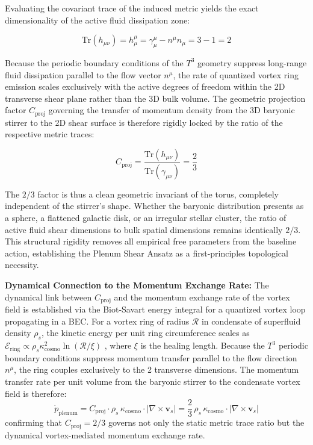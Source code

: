 \documentclass[aps,prd,10pt,twocolumn,superscriptaddress,nofootinbib]{revtex4-2}
\begin{document}
Evaluating the covariant trace of the induced metric yields the exact dimensionality of the active fluid dissipation zone:

\begin{equation}
\text{Tr}(h_{\mu\nu}) = h^\mu_\mu = \gamma^\mu_\mu - n^\mu n_\mu = 3 - 1 = 2
\end{equation}

Because the periodic boundary conditions of the $T^3$ geometry suppress long-range fluid dissipation parallel to the flow vector $n^\mu$, the rate of quantized vortex ring emission scales exclusively with the active degrees of freedom within the 2D transverse shear plane rather than the 3D bulk volume. The geometric projection factor $C_{\text{proj}}$ governing the transfer of momentum density from the 3D baryonic stirrer to the 2D shear surface is therefore rigidly locked by the ratio of the respective metric traces:

\begin{equation}
C_{\text{proj}} = \frac{\text{Tr}(h_{\mu\nu})}{\text{Tr}(\gamma_{\mu\nu})} = \frac{2}{3}
\end{equation}

The $2/3$ factor is thus a clean geometric invariant of the torus, completely independent of the stirrer's shape. Whether the baryonic distribution presents as a sphere, a flattened galactic disk, or an irregular stellar cluster, the ratio of active fluid shear dimensions to bulk spatial dimensions remains identically $2/3$. This structural rigidity removes all empirical free parameters from the baseline action, establishing the Plenum Shear Ansatz as a first-principles topological necessity.

\textbf{Dynamical Connection to the Momentum Exchange Rate:}
The dynamical link between $C_{\text{proj}}$ and the momentum exchange rate of the vortex field is established via the Biot-Savart energy integral for a quantized vortex loop propagating in a BEC. For a vortex ring of radius $\mathcal{R}$ in condensate of superfluid density $\rho_s$, the kinetic energy per unit ring circumference scales as $\mathcal{E}_{\text{ring}} \propto \rho_s \kappa_{\text{cosmo}}^2 \ln(\mathcal{R}/\xi)$ \cite{barcelo}, where $\xi$ is the healing length. Because the $T^3$ periodic boundary conditions suppress momentum transfer parallel to the flow direction $n^\mu$, the ring couples exclusively to the 2 transverse dimensions. The momentum transfer rate per unit volume from the baryonic stirrer to the condensate vortex field is therefore:
\begin{equation}
\dot{p}_{\text{plenum}} = C_{\text{proj}} \cdot \rho_s \, \kappa_{\text{cosmo}} \cdot |\nabla \times \mathbf{v}_s| = \frac{2}{3}\, \rho_s \, \kappa_{\text{cosmo}} \cdot |\nabla \times \mathbf{v}_s|
\end{equation}
confirming that $C_{\text{proj}} = 2/3$ governs not only the static metric trace ratio but the dynamical vortex-mediated momentum exchange rate.
\end{document}
